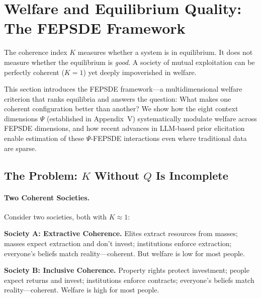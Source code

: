 

\section{Welfare and Equilibrium Quality: The FEPSDE Framework}
\label{sec:fepsde}

The coherence index $K$ measures whether a system is in equilibrium.
It does not measure whether the equilibrium is \emph{good}.
A society of mutual exploitation can be perfectly coherent ($K = 1$)
yet deeply impoverished in welfare.

This section introduces the FEPSDE framework---a multidimensional welfare criterion
that ranks equilibria and answers the question: What makes one coherent configuration
better than another? We show how the eight context dimensions $\Psi$
(established in Appendix~V) systematically modulate welfare across FEPSDE dimensions,
and how recent advances in LLM-based prior elicitation \citep{zhu2024eliciting, llmpriors2025scientific}
enable estimation of these $\Psi$-FEPSDE interactions even where traditional data are sparse.

\subsection{The Problem: $K$ Without $Q$ Is Incomplete}

\paragraph{Two Coherent Societies.}
Consider two societies, both with $K \approx 1$:

\textbf{Society A: Extractive Coherence.}
Elites extract resources from masses; masses expect extraction and don't invest;
institutions enforce extraction; everyone's beliefs match reality---coherent.
But welfare is low for most people.

\textbf{Society B: Inclusive Coherence.}
Property rights protect investment; people expect returns and invest;
institutions enforce contracts; everyone's beliefs match reality---coherent.
Welfare is high for most people.

